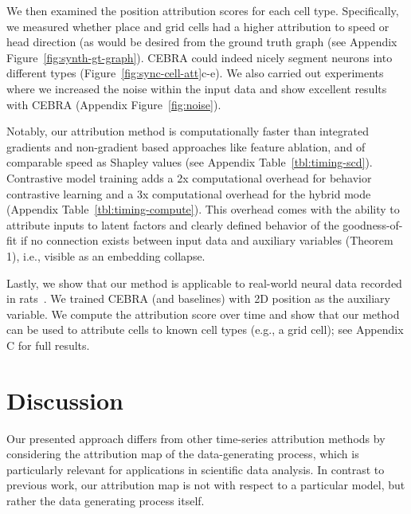 We then examined the position attribution scores for each cell type. Specifically, we measured whether place and grid cells had a higher attribution to speed or head direction (as would be desired from the ground truth graph (see Appendix Figure~\ref{fig:synth-gt-graph}). CEBRA could indeed nicely segment neurons into different types (Figure~\ref{fig:sync-cell-att}c-e). We also carried out experiments where we increased the noise within the input data and show excellent results with CEBRA (Appendix Figure~\ref{fig:noise}).

Notably, our attribution method is computationally faster than integrated gradients and non-gradient based approaches like feature ablation, and of comparable speed as Shapley values (see Appendix Table~\ref{tbl:timing-scd}). Contrastive model training adds a 2x computational overhead for behavior contrastive learning and a 3x computational overhead for the hybrid mode (Appendix Table~\ref{tbl:timing-compute}). This overhead comes with the ability to attribute inputs to latent factors and clearly defined behavior of the goodness-of-fit if no connection exists between input data and auxiliary variables (Theorem 1), i.e., visible as an embedding collapse.

Lastly, we show that our method is applicable to real-world neural data recorded in rats~\citep{Gardner2022}. We trained CEBRA (and baselines) with 2D position as the auxiliary variable. We compute the attribution score over time and show that our method can be used to attribute cells to known cell types (e.g., a grid cell); see Appendix C for full results.

\section{Discussion}

Our presented approach differs from other time-series attribution methods by considering the attribution map of the data-generating process, which is particularly relevant for applications in scientific data analysis. In contrast to previous work, our attribution map is not with respect to a particular model, but rather the data generating process itself. 

